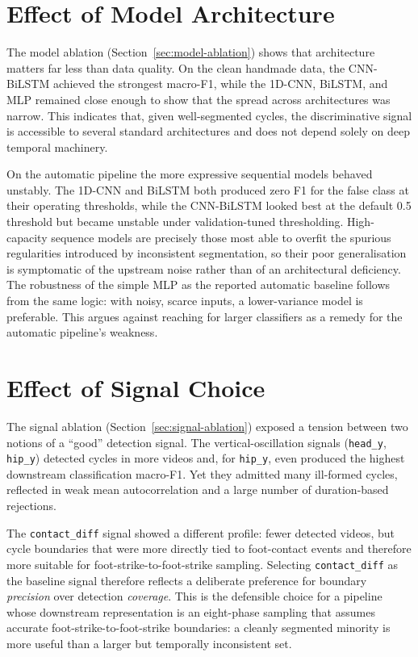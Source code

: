\section{Effect of Model Architecture}
\label{sec:disc-model}

The model ablation (Section~\ref{sec:model-ablation}) shows that architecture
matters far less than data quality. On the clean handmade data, the CNN-BiLSTM
achieved the strongest macro-F1, while the 1D-CNN, BiLSTM, and MLP remained
close enough to show that the spread across architectures was narrow. This
indicates that, given well-segmented cycles, the discriminative signal is
accessible to several standard architectures and does not depend solely on deep
temporal machinery.

On the automatic pipeline the more expressive sequential models behaved
unstably. The 1D-CNN and BiLSTM both produced zero F1 for the false class at
their operating thresholds, while the CNN-BiLSTM looked best at the default
0.5 threshold but became unstable under validation-tuned thresholding. High-capacity sequence models
are precisely those most able to overfit the spurious regularities introduced
by inconsistent segmentation, so their poor generalisation is symptomatic of
the upstream noise rather than of an architectural deficiency. The robustness
of the simple MLP as the reported automatic baseline follows from the same
logic: with noisy, scarce inputs, a lower-variance model is preferable. This
argues against reaching for larger classifiers as a remedy for the automatic
pipeline's weakness.

\section{Effect of Signal Choice}
\label{sec:disc-signal}

The signal ablation (Section~\ref{sec:signal-ablation}) exposed a tension
between two notions of a ``good'' detection signal. The vertical-oscillation
signals (\texttt{head\_y}, \texttt{hip\_y}) detected cycles in more videos and,
for \texttt{hip\_y}, even produced the highest downstream classification
macro-F1. Yet they admitted many ill-formed cycles, reflected in weak mean
autocorrelation and a large number of duration-based rejections.

The \texttt{contact\_diff} signal showed a different profile: fewer detected
videos, but cycle boundaries that were more directly tied to foot-contact
events and therefore more suitable for foot-strike-to-foot-strike sampling.
Selecting \texttt{contact\_diff} as the baseline signal therefore reflects a
deliberate preference for boundary \emph{precision} over detection
\emph{coverage}. This is the defensible choice for a pipeline whose downstream
representation is an eight-phase sampling that assumes accurate
foot-strike-to-foot-strike boundaries: a cleanly segmented minority is more
useful than a larger but temporally inconsistent set. 

